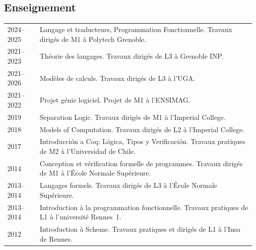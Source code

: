 \documentclass[12pt,a4paper]{article}
\makeatletter
\newcommand{\en}[1]{\foreignlanguage{english}{{#1}}}
\newcommand{\es}[1]{\foreignlanguage{spanish}{{#1}}}
\newcommand{\en}[1]{\foreignlanguage{english}{{#1}}}
\newcommand{\es}[1]{\foreignlanguage{spanish}{{#1}}}
\newenvironment{datecvsection}[1]%
               {\subsection*{#1}%
                 \noindent \begin{longtable}{@{}p{\annee}p{\texte}@{}}}
               {\end{longtable}}
\newcommand\familyName{\textsc}
\newcommand\placeName{}
\makeatother
\begin{document}
%
%

\begin{datecvsection}{Enseignement}

		2024–2025 & Langage et traducteurs, Programmation Fonctionnelle. Travaux dirigés de M1 à \placeName{Polytech Grenoble}. \\

		2021–2023 & Théorie des langages. Travaux dirigés de L3 à \placeName{Grenoble INP}. \\
		2021–2026 & Modèles de calculs. Travaux dirigés de L3 à l’\placeName{UGA}. \\
		2021–2022 & Projet génie logiciel. Projet de M1 à l’\placeName{ENSIMAG}. \\

    2019 & Separation Logic. Travaux dirigés de M1 à l’\en{\placeName{Imperial College}}. \\

    2018 & Models of Computation. Travaux dirigés de L2 à l’\en{\placeName{Imperial College}}. \\

    2017 & Introducción a Coq: Lógica, Tipos y Verificación. Travaux pratiques de M2 à l’\es{\placeName{Universidad de Chile}}. \\

    2014 & Conception et vérification formelle de programmes. Travaux dirigés de M1 à l’\placeName{École Normale Supérieure}. \\

    2013–2014 & Langages formels. Travaux dirigés de L3 à l’\placeName{École Normale Supérieure}. \\

    2013–2014 & Introduction à la programmation fonctionnelle. Travaux pratiques de L1 à l’université \placeName{Rennes}~1. \\

    2012 & Introduction à Scheme. Travaux pratiques et dirigés de L1 à l’\placeName{Insa} de \placeName{Rennes}. \\

\end{datecvsection}
\end{document}
